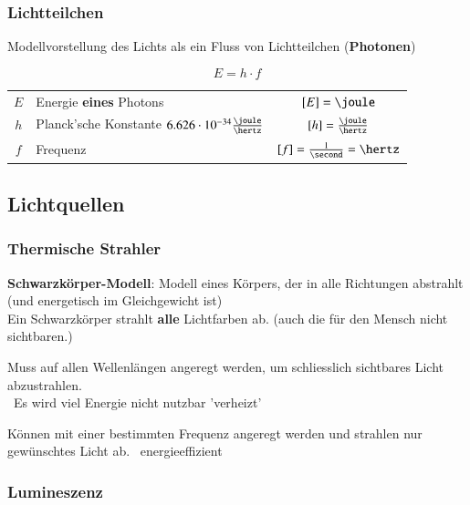 \subsubsection{Lichtteilchen}

Modellvorstellung des Lichts als ein Fluss von Lichtteilchen (\textbf{Photonen})


$$ \boxed{ E = h \cdot f } $$

\begin{tabular}{c l c}
	$E$ & Energie \textbf{eines} Photons & $[E] = \joule$ \\
	$h$ & Planck'sche Konstante $6.626 \cdot 10^{-34} \frac{\joule}{\hertz}$ & $[h] = \frac{\joule}{\hertz}$ \\
	$f$ & Frequenz & $[f] = \mathrm{\frac{1}{\second} = \hertz}$
\end{tabular}


\subsection{Lichtquellen}

\subsubsection{Thermische Strahler}

\textbf{Schwarzkörper-Modell}: Modell eines Körpers, der in alle Richtungen abstrahlt (und energetisch im Gleichgewicht ist) \\
Ein Schwarzkörper strahlt \textbf{alle} Lichtfarben ab. (auch die für den Mensch nicht sichtbaren.) 

\medskip


\begin{minipage}[t]{0.52\columnwidth}

    Muss auf allen Wellenlängen angeregt werden, um schliesslich sichtbares Licht abzustrahlen. \\
    \textrightarrow\ Es wird viel Energie nicht nutzbar 'verheizt'
\end{minipage}
\hfill
\begin{minipage}[t]{0.44\columnwidth}

    Können mit einer bestimmten Frequenz angeregt werden und strahlen nur gewünschtes Licht ab.
    \textrightarrow\ energieeffizient
\end{minipage}



\subsubsection{Lumineszenz}

